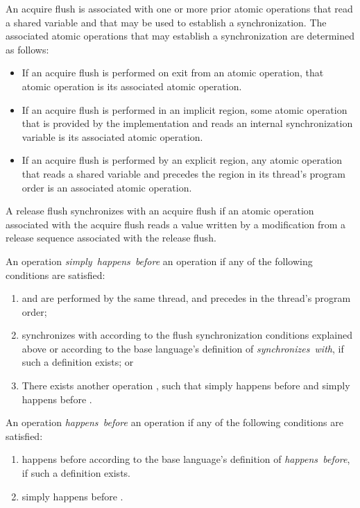 An acquire flush is associated with one or more prior atomic operations that
read a shared variable and that may be used to establish a synchronization.
The associated atomic operations that may establish a synchronization are
determined as follows:

\begin{itemize}
\item If an acquire flush is performed on exit from an atomic operation, that
    atomic operation is its associated atomic operation.
\item If an acquire flush is performed in an implicit  region, some
    atomic operation that is provided by the implementation and reads an internal
    synchronization variable is its associated atomic operation.
\item If an acquire flush is performed by an explicit  region, any
    atomic operation that reads a shared variable and precedes the
     region in its thread's program order is an associated atomic
    operation.
\end{itemize}

A release flush synchronizes with an acquire flush if an atomic operation
associated with the acquire flush reads a value written by a modification from
a release sequence associated with the release flush.

An operation  \emph{simply~happens~before} an operation  
if any of the following conditions are satisfied:
\begin{enumerate}
\item {} and  are performed by the same thread, and  
      precedes  in the thread's program order;
\item {} synchronizes with  according to the flush 
      synchronization conditions explained above or according
      to the base language's definition of \emph{synchronizes~with}, 
      if such a definition exists; or
\item There exists another operation , such that  simply 
      happens before  and  simply happens before .
\end{enumerate}

An operation  \emph{happens~before} an operation  if any of the following conditions are satisfied:
\begin{enumerate}
\item {} happens before  according to the base language's definition of \emph{happens~before}, if such a definition exists.
\item {} simply happens before .
\end{enumerate}

